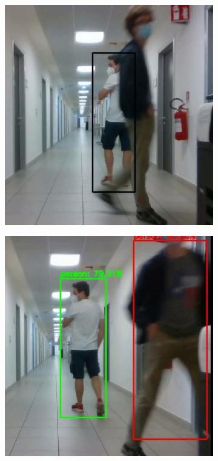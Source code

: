 \begin{figure}[!h]
\begin{subfigure}[!h]{0.325\textwidth}
	\end{subfigure}
	\begin{subfigure}[!h]{0.325\textwidth}
		\includegraphics[width=\linewidth]{images/solution/sequenceTrackOk9}
	\end{subfigure}
	\begin{subfigure}[!h]{0.325\textwidth}
		\includegraphics[width=\linewidth]{images/solution/sequenceTrackOk10}

\end{subfigure}
\end{figure}
